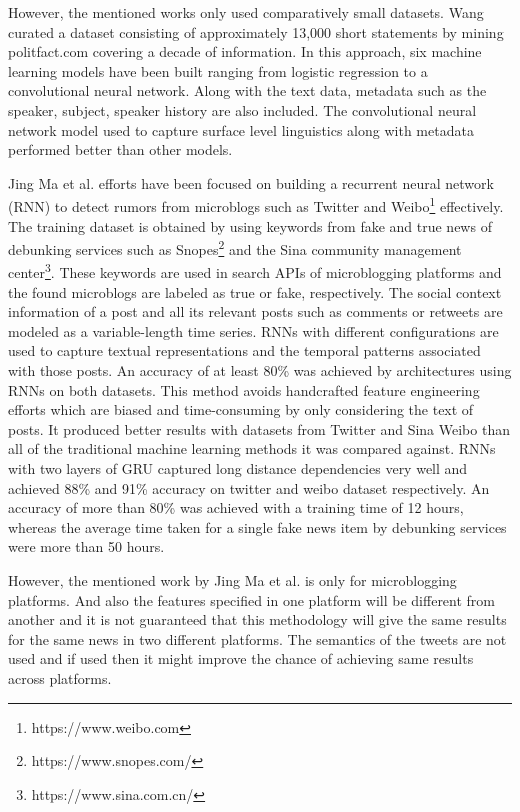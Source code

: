 \documentclass[a4paper, 11pt]{article}
\begin{document}
However, the mentioned works only used comparatively small datasets. Wang \parencite{Wang2017} curated a dataset consisting of approximately 13,000 short statements by mining politfact.com covering a decade of information. In this approach, six machine learning models have been built ranging from logistic regression to a convolutional neural network. Along with the text data, metadata such as the speaker, subject, speaker history are also included. The convolutional neural network model used to capture surface level linguistics along with metadata performed better than other models.

Jing Ma et al. \parencite{Ma} efforts have been focused on building a recurrent neural network (RNN) to detect rumors from microblogs such as Twitter and Weibo\footnote{https://www.weibo.com} effectively. The training dataset is obtained by using keywords from fake and true news of debunking services such as Snopes\footnote{https://www.snopes.com/} and the Sina community management center\footnote{https://www.sina.com.cn/}. These keywords are used in search APIs of microblogging platforms and the found microblogs are labeled as true or fake, respectively. The social context information of a post and all its relevant posts such as comments or retweets are modeled as a variable-length time series. RNNs with different configurations are used to capture textual representations and the temporal patterns associated with those posts. An accuracy of at least 80\% was achieved by architectures using RNNs on both datasets. This method avoids handcrafted feature engineering efforts which are biased and time-consuming by only considering the text of posts. It produced better results with datasets from Twitter and Sina Weibo than all of the traditional machine learning methods it was compared against. RNNs with two layers of GRU captured long distance dependencies very well and achieved 88\% and 91\% accuracy on twitter and weibo dataset respectively. An accuracy of more than 80\% was achieved with a training time of 12 hours, whereas the average time taken for a single fake news item by debunking services were more than 50 hours.

However, the mentioned work by Jing Ma et al. is only for microblogging platforms. And also the features specified in one platform will be different from another and it is not guaranteed that this methodology will give the same results for the same news in two different platforms. The semantics of the tweets are not used and if used then it might improve the chance of achieving same results across platforms.
\end{document}

